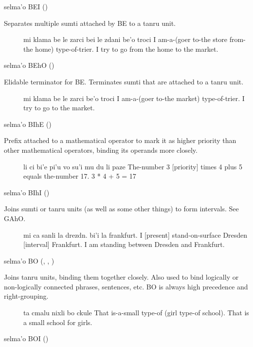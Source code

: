 selma'o BEI () 

Separates multiple sumti attached by BE to a tanru unit.
\begin{description}
\item[] mi klama be le zarci bei le zdani be'o troci I am-a-(goer to-the store from-the home) type-of-trier. I try to go from the home to the market.
\end{description}

selma'o BEhO () 

Elidable terminator for BE. Terminates sumti that are
    attached to a tanru unit.
\begin{description}
\item[] mi klama be le zarci be'o troci I am-a-(goer to-the market) type-of-trier. I try to go to the market.
\end{description}

selma'o BIhE () 

Prefix attached to a mathematical operator to mark it as
    higher priority than other mathematical operators, binding its
    operands more closely.
\begin{description}
\item[] li ci bi'e pi'u vo su'i mu du li paze The-number 3 [priority] times 4 plus 5 equals the-number 17. 3 * 4 + 5 = 17
\end{description}

selma'o BIhI () 

Joins sumti or tanru units (as well as some other things) to
    form intervals. See GAhO.
\begin{description}
\item[] mi ca sanli la drezdn. bi'i la frankfurt. I [present] stand-on-surface Dresden [interval] Frankfurt. I am standing between Dresden and Frankfurt.
\end{description}

selma'o BO (, , ) 

Joins tanru units, binding them together closely. Also used
    to bind logically or non-logically connected phrases,
    sentences, etc. BO is always high precedence and
    right-grouping.
\begin{description}
\item[] ta cmalu nixli bo ckule That is-a-small type-of (girl type-of school). That is a small school for girls.
\end{description}

selma'o BOI () 

